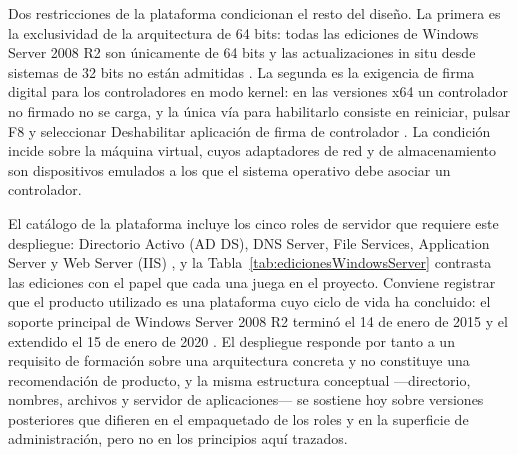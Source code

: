 \documentclass[12pt]{article}
\begin{document}
Dos restricciones de la plataforma condicionan el resto del diseño. La primera es la exclusividad de la arquitectura de 64 bits: todas las ediciones de Windows Server 2008 R2 son únicamente de 64 bits y las actualizaciones in situ desde sistemas de 32 bits no están admitidas \parencite{microsoftInstallWs2008r2}. La segunda es la exigencia de firma digital para los controladores en modo kernel: en las versiones x64 un controlador no firmado no se carga, y la única vía para habilitarlo consiste en reiniciar, pulsar F8 y seleccionar Deshabilitar aplicación de firma de controlador \parencite{microsoftInstallWs2008r2}. La condición incide sobre la máquina virtual, cuyos adaptadores de red y de almacenamiento son dispositivos emulados a los que el sistema operativo debe asociar un controlador.

El catálogo de la plataforma incluye los cinco roles de servidor que requiere este despliegue: Directorio Activo (AD DS), DNS Server, File Services, Application Server y Web Server (IIS) \parencite{microsoftServerRoles}, y la Tabla~\ref{tab:edicionesWindowsServer} contrasta las ediciones con el papel que cada una juega en el proyecto. Conviene registrar que el producto utilizado es una plataforma cuyo ciclo de vida ha concluido: el soporte principal de Windows Server 2008 R2 terminó el 14 de enero de 2015 y el extendido el 15 de enero de 2020 \parencite{microsoftLifecycleWs2008r2}. El despliegue responde por tanto a un requisito de formación sobre una arquitectura concreta y no constituye una recomendación de producto, y la misma estructura conceptual ---directorio, nombres, archivos y servidor de aplicaciones--- se sostiene hoy sobre versiones posteriores que difieren en el empaquetado de los roles y en la superficie de administración, pero no en los principios aquí trazados.
\end{document}
